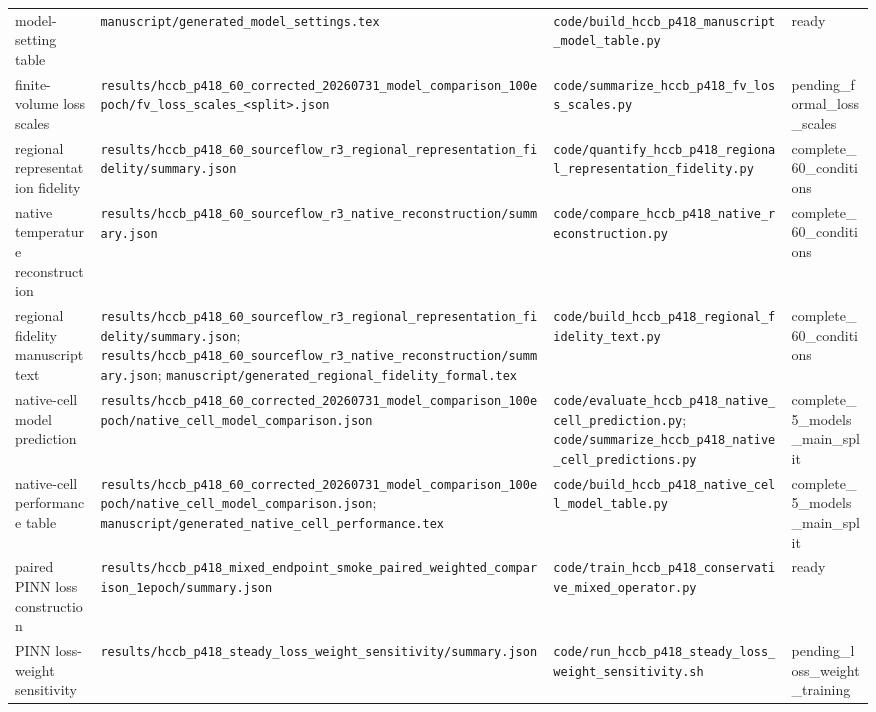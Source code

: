 \begin{longtable}{>{\raggedright\arraybackslash}p{2.8cm}>{\raggedright\arraybackslash}p{6.6cm}>{\raggedright\arraybackslash}p{6.4cm}>{\raggedright\arraybackslash}p{2.4cm}}
model-setting table & \nolinkurl{manuscript/generated_model_settings.tex} & \nolinkurl{code/build_hccb_p418_manuscript_model_table.py} & ready \\
finite-volume loss scales & \nolinkurl{results/hccb_p418_60_corrected_20260731_model_comparison_100epoch/fv_loss_scales_<split>.json} & \nolinkurl{code/summarize_hccb_p418_fv_loss_scales.py} & pending\_\allowbreak{}formal\_\allowbreak{}loss\_\allowbreak{}scales \\
regional representation fidelity & \nolinkurl{results/hccb_p418_60_sourceflow_r3_regional_representation_fidelity/summary.json} & \nolinkurl{code/quantify_hccb_p418_regional_representation_fidelity.py} & complete\_\allowbreak{}60\_\allowbreak{}conditions \\
native temperature reconstruction & \nolinkurl{results/hccb_p418_60_sourceflow_r3_native_reconstruction/summary.json} & \nolinkurl{code/compare_hccb_p418_native_reconstruction.py} & complete\_\allowbreak{}60\_\allowbreak{}conditions \\
regional fidelity manuscript text & \nolinkurl{results/hccb_p418_60_sourceflow_r3_regional_representation_fidelity/summary.json}; \nolinkurl{results/hccb_p418_60_sourceflow_r3_native_reconstruction/summary.json}; \nolinkurl{manuscript/generated_regional_fidelity_formal.tex} & \nolinkurl{code/build_hccb_p418_regional_fidelity_text.py} & complete\_\allowbreak{}60\_\allowbreak{}conditions \\
native-cell model prediction & \nolinkurl{results/hccb_p418_60_corrected_20260731_model_comparison_100epoch/native_cell_model_comparison.json} & \nolinkurl{code/evaluate_hccb_p418_native_cell_prediction.py}; \nolinkurl{code/summarize_hccb_p418_native_cell_predictions.py} & complete\_\allowbreak{}5\_\allowbreak{}models\_\allowbreak{}main\_\allowbreak{}split \\
native-cell performance table & \nolinkurl{results/hccb_p418_60_corrected_20260731_model_comparison_100epoch/native_cell_model_comparison.json}; \nolinkurl{manuscript/generated_native_cell_performance.tex} & \nolinkurl{code/build_hccb_p418_native_cell_model_table.py} & complete\_\allowbreak{}5\_\allowbreak{}models\_\allowbreak{}main\_\allowbreak{}split \\
paired PINN loss construction & \nolinkurl{results/hccb_p418_mixed_endpoint_smoke_paired_weighted_comparison_1epoch/summary.json} & \nolinkurl{code/train_hccb_p418_conservative_mixed_operator.py} & ready \\
PINN loss-weight sensitivity & \nolinkurl{results/hccb_p418_steady_loss_weight_sensitivity/summary.json} & \nolinkurl{code/run_hccb_p418_steady_loss_weight_sensitivity.sh} & pending\_\allowbreak{}loss\_\allowbreak{}weight\_\allowbreak{}training \\

\end{longtable}
